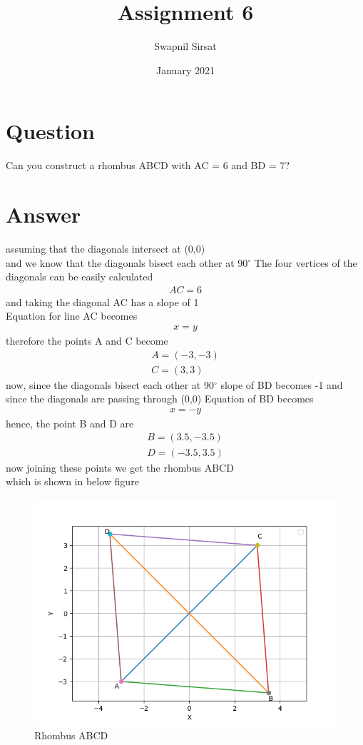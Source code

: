 \documentclass{article}
\title{Assignment 6}
\author{Swapnil Sirsat }
\date{January 2021}
\begin{document}
\maketitle

\section*{Question}
Can you construct a rhombus ABCD with
AC = 6 and BD = 7?
\section*{Answer}
assuming that the diagonals intersect at (0,0) \\
and we know that the diagonals bisect each other at 90$^\circ$
The four vertices of the diagonals can be easily calculated\\
\begin{gather*}
    AC = 6
\end{gather*}
and taking the diagonal AC has a slope of 1 \\
Equation for line AC becomes\\
\begin{gather*}
    x = y
\end{gather*}
therefore the points A and C become
\begin{gather*}
    A = (-3,-3)\\
    C = (3,3)
\end{gather*}
now, since the diagonals bisect each other at 90$^\circ$
slope of BD becomes -1 and since the diagonals are passing through (0,0)
Equation of BD becomes 
\begin{gather*}
    x = -y
\end{gather*}
hence, the point B and D are
\begin{gather*}
    B = (3.5,-3.5)\\
    D = (-3.5,3.5)
\end{gather*}
\newpage
now joining these points we get the rhombus ABCD
\\ which is shown in below figure

\begin{figure}[h!]
    \centering
    \includegraphics{Figure_1.png}
    \caption{Rhombus ABCD}
    \label{fig:my_label}
\end{figure}
\newpage
\end{document}
